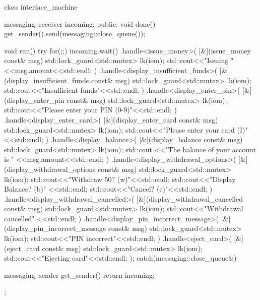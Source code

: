 \begin{cpp}
class interface_machine
{
  messaging::receiver incoming;
public:
  void done()
  {
    get_sender().send(messaging::close_queue());
  }

  void run()
  {
    try
    {
      for(;;)
      {
        incoming.wait()
          .handle<issue_money>(
           [&](issue_money const& msg)
           {
             {
               std::lock_guard<std::mutex> lk(iom);
               std::cout<<"Issuing "
                 <<msg.amount<<std::endl;
             }
           })
          .handle<display_insufficient_funds>(
           [&](display_insufficient_funds const& msg)
           {
             {
               std::lock_guard<std::mutex> lk(iom);
               std::cout<<"Insufficient funds"<<std::endl;
             }
           })
          .handle<display_enter_pin>(
           [&](display_enter_pin const& msg)
           {
             {
               std::lock_guard<std::mutex> lk(iom);
               std::cout<<"Please enter your PIN (0-9)"<<std::endl;
             }
           })
          .handle<display_enter_card>(
           [&](display_enter_card const& msg)
           {
             {
               std::lock_guard<std::mutex> lk(iom);
               std::cout<<"Please enter your card (I)"
                 <<std::endl;
             }
           })
          .handle<display_balance>(
           [&](display_balance const& msg)
           {
             {
               std::lock_guard<std::mutex> lk(iom);
               std::cout
                 <<"The balance of your account is "
                 <<msg.amount<<std::endl;
             }
           })
          .handle<display_withdrawal_options>(
           [&](display_withdrawal_options const& msg)
           {
             {
               std::lock_guard<std::mutex> lk(iom);
               std::cout<<"Withdraw 50? (w)"<<std::endl;
               std::cout<<"Display Balance? (b)"
                 <<std::endl;
               std::cout<<"Cancel? (c)"<<std::endl;
             }
           })
          .handle<display_withdrawal_cancelled>(
           [&](display_withdrawal_cancelled const& msg)
           {
             {
               std::lock_guard<std::mutex> lk(iom);
               std::cout<<"Withdrawal cancelled"
                 <<std::endl;
             }
           })
          .handle<display_pin_incorrect_message>(
           [&](display_pin_incorrect_message const& msg)
           {
             {
               std::lock_guard<std::mutex> lk(iom);
               std::cout<<"PIN incorrect"<<std::endl;
             }
           })
          .handle<eject_card>(
           [&](eject_card const& msg)
           {
             {
               std::lock_guard<std::mutex> lk(iom);
               std::cout<<"Ejecting card"<<std::endl;
             }
           });
      }
    }
    catch(messaging::close_queue&)
    {
    }
  }

  messaging::sender get_sender()
  {
    return incoming;
  }
};
\end{cpp}

